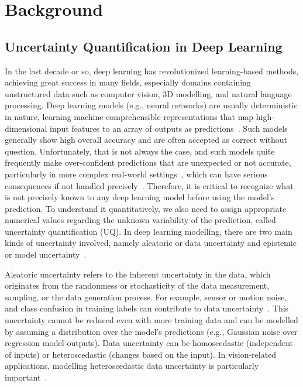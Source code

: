 \chapter{Background}\label{ch:background}



\section{Uncertainty Quantification in Deep Learning}\label{back_uqdl}
In the last decade or so, deep learning has revolutionized learning-based methods, achieving great success in many fields, especially domains containing unstructured data such as computer vision, 3D modelling, and natural language processing. Deep learning models (e.g., neural networks) are usually deterministic in nature, learning machine-comprehensible representations that map high-dimensional input features to an array of outputs as predictions~\cite{ReprLearn}. Such models generally show high overall accuracy and are often accepted as correct without question. Unfortunately, that is not always the case, and such models quite frequently make over-confident predictions that are unexpected or not accurate, particularly in more complex real-world settings~\cite{DLDifficult1, DLDifficult2}, which can have serious consequences if not handled precisely~\cite{DLDisaster1, DLDisaster2, DLDisaster3, DLDisaster4}. Therefore, it is critical to recognize what is not precisely known to any deep learning model before using the model's prediction. To understand it quantitatively, we also need to assign appropriate numerical values regarding the unknown variability of the prediction, called uncertainty quantification (UQ). In deep learning modelling, there are two main kinds of uncertainty involved, namely aleatoric or data uncertainty and epistemic or model uncertainty~\cite{UncertDeepL}.

Aleatoric uncertainty refers to the inherent uncertainty in the data, which originates from the randomness or stochasticity of the data measurement, sampling, or the data generation process. For example, sensor or motion noise, and class confusion in training labels can contribute to data uncertainty~\cite{UncertDeepL}. This uncertainty cannot be reduced even with more training data and can be modelled by assuming a distribution over the model's predictions (e.g., Gaussian noise over regression model outputs). Data uncertainty can be homoscedastic (independent of inputs) or heteroscedastic (changes based on the input). In vision-related applications, modelling heteroscedastic data uncertainty is particularly important~\cite{UncertDeepL}.

